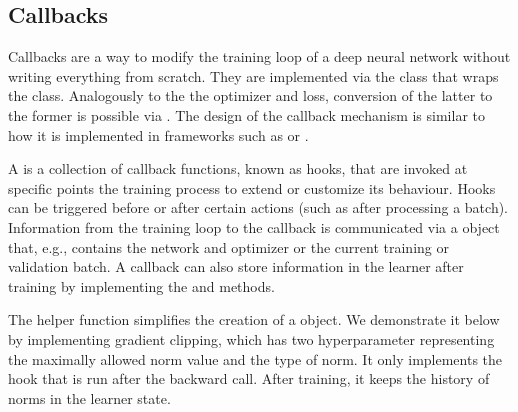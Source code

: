 \documentclass[article]{jss}
\theoremstyle{definition}
\begin{document}
\begin{CodeInput}
\end{CodeInput}

\subsection{Callbacks}\label{sec:extending-callbacks}

Callbacks are a way to modify the training loop of a deep neural network without writing everything from scratch.
They are implemented via the  class  that wraps the  class.
Analogously to the the optimizer and loss, conversion of the latter to the former is possible via .
The design of the callback mechanism is similar to how it is implemented in frameworks such as \keras{} or \luz{} \citep{ref-chollet2018keras, ref-luz2023}.

A  is a collection of callback functions, known as hooks, that are invoked at specific points the training process to extend or customize its behaviour.
Hooks can be triggered before or after certain actions (such as after processing a batch).
Information from the training loop to the callback is communicated via a  object that, e.g., contains the network and optimizer or the current training or validation batch.
A callback can also store information in the learner after training by implementing the  and  methods.

The  helper function simplifies the creation of a  object.
We demonstrate it below by implementing gradient clipping, which has two hyperparameter representing the maximally allowed norm value and the type of norm.
It only implements the hook that is run after the backward call.
After training, it keeps the history of norms in the learner state.

\end{document}
